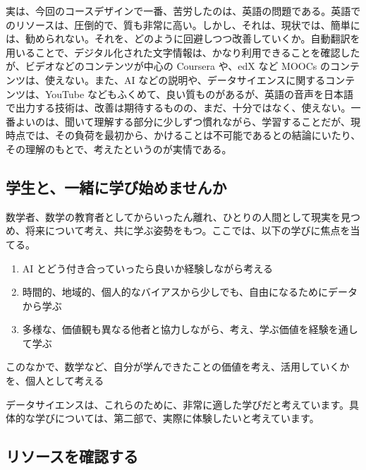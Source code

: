 \documentclass[
]{bxjsbook}
\providecommand{\tightlist}{%
  \setlength{\itemsep}{0pt}\setlength{\parskip}{0pt}}
\theoremstyle{definition}
\theoremstyle{definition}
\theoremstyle{definition}
\theoremstyle{definition}
\theoremstyle{remark}
\begin{document}
実は、今回のコースデザインで一番、苦労したのは、英語の問題である。英語でのリソースは、圧倒的で、質も非常に高い。しかし、それは、現状では、簡単には、勧められない。それを、どのように回避しつつ改善していくか。自動翻訳を用いることで、デジタル化された文字情報は、かなり利用できることを確認したが、ビデオなどのコンテンツが中心の Coursera や、edX など MOOCs のコンテンツは、使えない。また、AI などの説明や、データサイエンスに関するコンテンツは、YouTube などもふくめて、良い質ものがあるが、英語の音声を日本語で出力する技術は、改善は期待するものの、まだ、十分ではなく、使えない。一番よいのは、聞いて理解する部分に少しずつ慣れながら、学習することだが、現時点では、その負荷を最初から、かけることは不可能であるとの結論にいたり、その理解のもとで、考えたというのが実情である。

\hypertarget{ux5b66ux751fux3068ux4e00ux7dd2ux306bux5b66ux3073ux59cbux3081ux307eux305bux3093ux304b}{%
\subsection{学生と、一緒に学び始めませんか}\label{ux5b66ux751fux3068ux4e00ux7dd2ux306bux5b66ux3073ux59cbux3081ux307eux305bux3093ux304b}}

数学者、数学の教育者としてからいったん離れ、ひとりの人間として現実を見つめ、将来について考え、共に学ぶ姿勢をもつ。ここでは、以下の学びに焦点を当てる。

\begin{enumerate}
\def\labelenumi{\arabic{enumi}.}
\tightlist
\item
  AI とどう付き合っていったら良いか経験しながら考える
\item
  時間的、地域的、個人的なバイアスから少しでも、自由になるためにデータから学ぶ
\item
  多様な、価値観も異なる他者と協力しながら、考え、学ぶ価値を経験を通して学ぶ
\end{enumerate}

このなかで、数学など、自分が学んできたことの価値を考え、活用していくかを、個人として考える

データサイエンスは、これらのために、非常に適した学びだと考えています。具体的な学びについては、第二部で、実際に体験したいと考えています。

\hypertarget{ux30eaux30bdux30fcux30b9ux3092ux78baux8a8dux3059ux308b}{%
\subsection{リソースを確認する}\label{ux30eaux30bdux30fcux30b9ux3092ux78baux8a8dux3059ux308b}}
\end{document}
